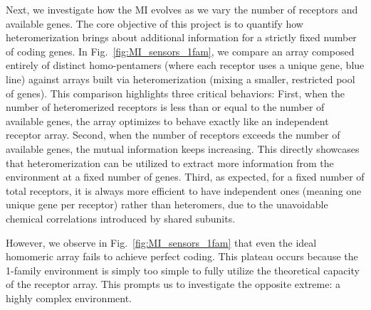 \documentclass[
    reprint, %
    amsmath,
    amssymb,
    aps,
    prb,      %
    floatfix
]{revtex4-2}
\begin{document}
Next, we investigate how the MI evolves as we vary the number of receptors and available genes. The core objective of this project is to quantify how heteromerization brings about additional information for a strictly fixed number of coding genes. In Fig.~\ref{fig:MI_sensors_1fam}, we compare an array composed entirely of distinct homo-pentamers (where each receptor uses a unique gene, blue line) against arrays built via heteromerization (mixing a smaller, restricted pool of genes). This comparison highlights three critical behaviors:
First, when the number of heteromerized receptors is less than or equal to the number of available genes, the array optimizes to behave exactly like an independent receptor array. 
Second, when the number of receptors exceeds the number of available genes, the mutual information keeps increasing. This directly showcases that heteromerization can be utilized to extract more information from the environment at a fixed number of genes. 
Third, as expected, for a fixed number of total receptors, it is always more efficient to have independent ones (meaning one unique gene per receptor) rather than heteromers, due to the unavoidable chemical correlations introduced by shared subunits.

However, we observe in Fig.~\ref{fig:MI_sensors_1fam} that even the ideal homomeric array fails to achieve perfect coding. This plateau occurs because the 1-family environment is simply too simple to fully utilize the theoretical capacity of the receptor array. This prompts us to investigate the opposite extreme: a highly complex environment.

\end{document}
